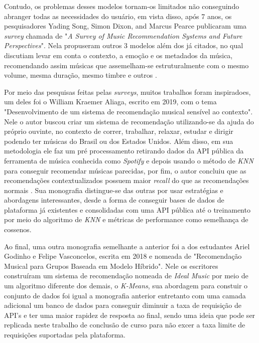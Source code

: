 \documentclass[12pt, %
openright, 
oneside, %
a4paper,    %
brazil]{facom-ufu-abntex2}
\begin{document}
Contudo, os problemas desses modelos tornam-os limitados não conseguindo abranger todas as necessidades do usuário, em vista disso, após 7 anos, os pesquisadores Yading Song, Simon Dixon, and Marcus Pearce publicaram uma \textit{survey} chamada de "\textit{A Survey of Music Recommendation Systems and Future Perspectives}". Nela propuseram outros 3 modelos além dos já citados, no qual discutiam levar em conta o contexto, a emoção e os metadados da música, recomendando assim músicas que assemelham-se estruturalmente com o mesmo volume, mesma duração, mesmo timbre e outros \cite{song2012survey}.

Por meio das pesquisas feitas pelas \textit{surveys}, muitos trabalhos foram inspiradoes, um deles foi o William Kraemer Aliaga, escrito em 2019, com o tema "Desenvolvimento de um sistema de recomendação musical sensível ao contexto". Nele o autor buscou criar um sistema de recomendação utilizando-se da ajuda do próprio ouvinte, no contexto de correr, trabalhar, relaxar, estudar e dirigir podendo ter músicas do Brasil ou dos Estados Unidos. Além disso, em sua metodologia ele faz um pré processamento retirando dados da API pública da ferramenta de música conhecida como \textit{Spotify} e depois usando o método de \textit{KNN} para conseguir recomendar músicas parecidas, por fim, o autor concluiu que as recomendações contextualizados possuem maior \textit{recall} do que as recomendações normais \cite{aliaga2019desenvolvimento}. Sua monografia distingue-se das outras por usar estratégias e abordagens interessantes, desde a forma de conseguir bases de dados de plataforma já existentes e consolidadas com uma API pública até o treinamento por meio do algoritmo de \textit{KNN} e métricas de performance como semelhança de cossenos.

Ao final, uma outra monografia semelhante a anterior foi a dos estudantes Ariel Godinho e Felipe Vasconcelos, escrita em 2018 e nomeada de "Recomendação Musical para Grupos Baseada em Modelo Híbrido". Nele os escritores construíram um sistema de recomendação nomeada de \textit{Ideal Music} por meio de um algoritmo diferente dos demais, o \textit{K-Means}, sua abordagem para constuir o conjunto de dados foi igual a monografia anterior entretanto com uma camada adicional um banco de dados para conseguir diminuir a taxa de requisição de API's e ter uma maior rapidez de resposta ao final\cite{godinhorecomendaccao}, sendo uma ideia que pode ser replicada neste trabalho de conclusão de curso para não excer a taxa limite de requisições suportadas pela plataforma.
\end{document}
